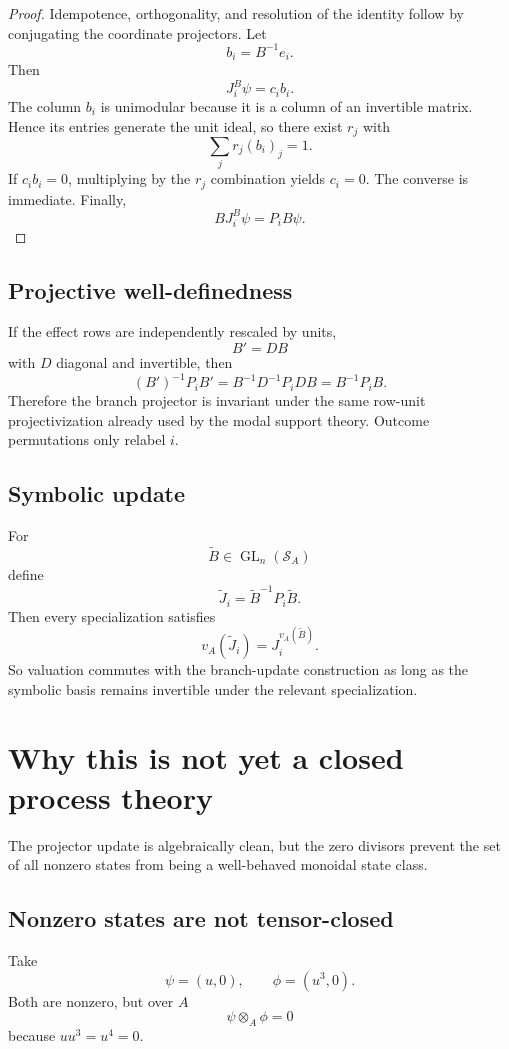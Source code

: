 \documentclass[11pt]{article}
\theoremstyle{definition}
\newcommand{\Sring}{\mathcal{S}_A}
\newcommand{\GL}{\operatorname{GL}}
\begin{document}
\begin{proof}
Idempotence, orthogonality, and resolution of the identity follow by conjugating the coordinate
projectors. Let
\[
b_i=B^{-1}e_i.
\]
Then
\[
J_i^B\psi=c_i b_i.
\]
The column \(b_i\) is unimodular because it is a column of an invertible matrix. Hence its entries
generate the unit ideal, so there exist \(r_j\) with
\[
\sum_j r_j(b_i)_j=1.
\]
If \(c_i b_i=0\), multiplying by the \(r_j\) combination yields \(c_i=0\). The converse is
immediate. Finally,
\[
B J_i^B\psi=P_iB\psi.
\]
\end{proof}

\subsection{Projective well-definedness}

If the effect rows are independently rescaled by units,
\[
B'=DB
\]
with \(D\) diagonal and invertible, then
\[
(B')^{-1}P_iB'
=B^{-1}D^{-1}P_iDB
=B^{-1}P_iB.
\]
Therefore the branch projector is invariant under the same row-unit projectivization already used by
the modal support theory. Outcome permutations only relabel \(i\).

\subsection{Symbolic update}

For
\[
\widetilde B\in\GL_n(\Sring)
\]
define
\[
\widetilde J_i=\widetilde B^{-1}P_i\widetilde B.
\]
Then every specialization satisfies
\[
v_A(\widetilde J_i)=J_i^{v_A(\widetilde B)}.
\]
So valuation commutes with the branch-update construction as long as the symbolic basis remains
invertible under the relevant specialization.

\section{Why this is not yet a closed process theory}

The projector update is algebraically clean, but the zero divisors prevent the set of all nonzero
states from being a well-behaved monoidal state class.

\subsection{Nonzero states are not tensor-closed}

Take
\[
\psi=(u,0),\qquad \phi=(u^3,0).
\]
Both are nonzero, but over \(A\)
\[
\psi\otimes_A\phi=0
\]
because \(uu^3=u^4=0\).
\end{document}
